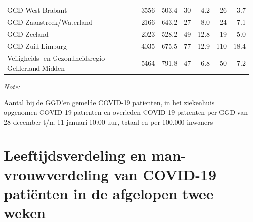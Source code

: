 \documentclass[
  english,
  man,floatsintext]{apa6}
\begin{document}
\begin{table}[H]
\begin{threeparttable}
\begin{tabular}{lrrrrrr}
GGD West-Brabant & 3556 & 503.4 & 30 & 4.2 & 26 & 3.7\\
GGD Zaanstreek/Waterland & 2166 & 643.2 & 27 & 8.0 & 24 & 7.1\\
GGD Zeeland & 2023 & 528.2 & 49 & 12.8 & 19 & 5.0\\
GGD Zuid-Limburg & 4035 & 675.5 & 77 & 12.9 & 110 & 18.4\\
Veiligheids- en Gezondheidsregio Gelderland-Midden & 5464 & 791.8 & 47 & 6.8 & 50 & 7.2\\
\bottomrule
\end{tabular}
\begin{tablenotes}
\item \textit{Note: } 
\item Aantal bij de GGD’en gemelde COVID-19 patiënten, in het ziekenhuis opgenomen COVID-19 patiënten en overleden COVID-19 patiënten per GGD van 28 december t/m 11 januari 10:00 uur, totaal en per 100.000 inwoners
\end{tablenotes}
\end{threeparttable}
\endgroup{}
\end{table}

\newpage

\hypertarget{leeftijdsverdeling-en-man-vrouwverdeling-van-covid-19-patiuxebnten-in-de-afgelopen-twee-weken}{%
\section{Leeftijdsverdeling en man-vrouwverdeling van COVID-19 patiënten in de afgelopen twee weken}\label{leeftijdsverdeling-en-man-vrouwverdeling-van-covid-19-patiuxebnten-in-de-afgelopen-twee-weken}}
\end{document}

